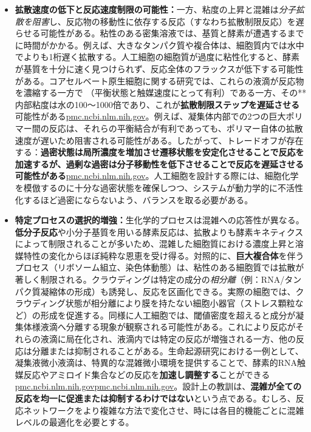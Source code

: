 \begin{itemize}
    \item \textbf{拡散速度の低下と反応速度制限の可能性：}一方、粘度の上昇と混雑は\textit{分子拡散を阻害}し、反応物の移動性に依存する反応（すなわち拡散制限反応）を遅らせる可能性がある。粘性のある密集溶液では、基質と酵素が遭遇するまでに時間がかかる。例えば、大きなタンパク質や複合体は、細胞質内では水中でよりも1桁遅く拡散する。人工細胞の細胞質が過度に粘性化すると、酵素が基質を十分に速く見つけられず、反応全体のフラックスが低下する可能性がある。コアセルベート原生細胞に関する研究では、これらの液滴が反応物を濃縮する一方で （平衡状態と触媒速度にとって有利）である一方、その**内部粘度は水の100～1000倍であり、これが\textbf{拡散制限ステップを遅延させる}可能性がある\href{https://pmc.ncbi.nlm.nih.gov/articles/PMC11256357/\#:~:text=The\%20high\%20macromolecular\%20content\%20of,ribozymes\%20and\%20other\%20large\%20molecules}{pmc.ncbi.nlm.nih.gov}。例えば、凝集体内部での2つの巨大ポリマー間の反応は、それらの平衡結合が有利であっても、ポリマー自体の拡散速度が遅いため阻害される可能性がある。したがって、トレードオフが存在する：\textbf{過密状態は局所濃度を増加させ遷移状態を安定化させることで反応を加速するが、過剰な過密は分子移動性を低下させることで反応を遅延させる可能性がある}\href{https://pmc.ncbi.nlm.nih.gov/articles/PMC11256357/\#:~:text=The\%20high\%20macromolecular\%20content\%20of,ribozymes\%20and\%20other\%20large\%20molecules}{pmc.ncbi.nlm.nih.gov}。人工細胞を設計する際には、細胞化学を模倣するのに十分な過密状態を確保しつつ、システムが動力学的に不活性化するほど過密にならないよう、バランスを取る必要がある。
    \item \textbf{特定プロセスの選択的増強：}生化学的プロセスは混雑への応答性が異なる。\textbf{低分子反応}や小分子基質を用いる酵素反応は、拡散よりも酵素キネティクスによって制限されることが多いため、混雑した細胞質における濃度上昇と溶媒特性の変化からほぼ純粋な恩恵を受け得る。対照的に、\textbf{巨大複合体}を伴うプロセス（リボソーム組立、染色体動態）は、粘性のある細胞質では拡散が著しく制限される。クラウディングは特定の成分の\textit{相分離}（例：RNA/タンパク質凝縮体の形成）も誘発し、反応を区画化できる。実際の細胞では、クラウディング状態が相分離により膜を持たない細胞小器官（ストレス顆粒など）の形成を促進する。同様に人工細胞では、閾値密度を超えると成分が凝集体様液滴へ分離する現象が観察される可能性がある。これにより反応がそれらの液滴に局在化され、液滴内では特定の反応が増強される一方、他の反応は分離または抑制されることがある。生命起源研究における一例として、凝集液微小液滴は、特異的な混雑微小環境を提供することで、酵素的RNA触媒反応やアミロイド集合などの反応を\textbf{加速し調整する}ことができる\href{https://pmc.ncbi.nlm.nih.gov/articles/PMC11256357/\#:~:text=selectivity\%20for\%20amino\%20acids\%20that,strongly\%20with\%20the\%20coacervate\%20matrix}{pmc.ncbi.nlm.nih.gov}\href{https://pmc.ncbi.nlm.nih.gov/articles/PMC11256357/\#:~:text=The\%20high\%20macromolecular\%20content\%20of,ribozymes\%20and\%20other\%20large\%20molecules}{pmc.ncbi.nlm.nih.gov}。設計上の教訓は、\textbf{混雑が全ての反応を均一に促進または抑制するわけではない}という点である。むしろ、反応ネットワークをより複雑な方法で変化させ、時には各目的機能ごとに混雑レベルの最適化を必要とする。

\end{itemize}
